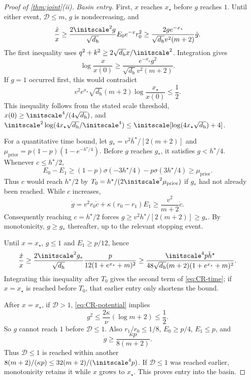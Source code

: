 \begin{proof}[Proof of \cref{thm:joint}(ii)]
\emph{Basin entry.}
First, $x$ reaches $x_\star$ before $g$ reaches $1$. Until either event, $\mathcal D\le m$, $g$ is nondecreasing, and
\[
 \frac{\dot x}{x}\ge\frac{2\initscale^2g}{\sqrt{d_{\mathrm h}}}E_0e^{-x}r_0^2
 \ge\frac{2ge^{-x_\star}}{\sqrt{d_{\mathrm h}}v^2(m+2)}\dot g.
\]
The first inequality uses $q^2+k^2\ge2\sqrt{d_{\mathrm h}}x/\initscale^2$.
Integration gives
\[
 \log\frac{x}{x(0)}\ge\frac{e^{-x_\star}g^2}{\sqrt{d_{\mathrm h}}v^2(m+2)}.
\]
If $g=1$ occurred first, this would contradict
\[
 v^2e^{x_\star}\sqrt{d_{\mathrm h}}(m+2)\log\frac{x_\star}{x(0)}\le\frac12.
\]
This inequality follows from the stated scale threshold, $x(0)\ge\initscale^4/(4\sqrt{d_{\mathrm h}})$, and
$\initscale^2\log(4x_\star\sqrt{d_{\mathrm h}}/\initscale^4)\le\initscale[\log(4x_\star\sqrt{d_{\mathrm h}})+4]$.

For a quantitative time bound, let $g_*=v^2\bar h^\star/[2(m+2)]$ and
$\mu_{\mathrm{prior}}=p(1-p)(1-e^{-h^\star/4})$.
Before $g$ reaches $g_*$, it satisfies $g<h^\star/4$. Whenever $c\le h^\star/2$,
\[
 E_0-E_1\ge(1-p)\sigma(-3h^\star/4)-p\sigma(3h^\star/4)\ge\mu_{\mathrm{prior}}.
\]
Thus $c$ would reach $h^\star/2$ by $T_0=h^\star/(2\initscale^2\mu_{\mathrm{prior}})$ if $g_*$ had not already been reached.
While $c$ increases,
\[
 \dot g=v^2r_0\dot c+\kappa(r_0-r_1)E_1\ge\frac{v^2}{m+2}\dot c.
\]
Consequently reaching $c=h^\star/2$ forces $g\ge v^2h^\star/[2(m+2)]\ge g_*$.
By monotonicity, $g\ge g_*$ thereafter, up to the relevant stopping event.

Until $x=x_\star$, $g\le1$ and $E_1\ge p/12$, hence
\[
 \frac{\dot x}{x}\ge\frac{2\initscale^2g_*}{\sqrt{d_{\mathrm h}}}
       \frac{p}{12(1+e^{x_\star}+m)^2}
 \ge\frac{\initscale^4p\bar h^\star}{48\sqrt{d_{\mathrm h}}(m+2)(1+e^{x_\star}+m)^2}.
\]
Integrating this inequality after $T_0$ gives the second term of \cref{eq:CR-time}; if $x=x_\star$ is reached before $T_0$,
that earlier entry only shortens the bound.

After $x=x_\star$, if $\mathcal D>1$, \eqref{eq:CR-potential} implies
\[
 g^2\le\frac{2\kappa}{\nu}(\log m+2)\le\frac12.
\]
So $g$ cannot reach $1$ before $\mathcal D\le1$. Also $r_1/r_0\le1/8$, $E_0\ge p/4$, $E_1\le p$, and
\[
 \dot g\ge\frac{\kappa p}{8(m+2)}.
\]
Thus $\mathcal D\le1$ is reached within another $8(m+2)/(\kappa p)\le32(m+2)/(\initscale^4p)$.
If $\mathcal D\le1$ was reached earlier, monotonicity retains it while $x$ grows to $x_\star$.
This proves entry into the basin.


\end{proof}
